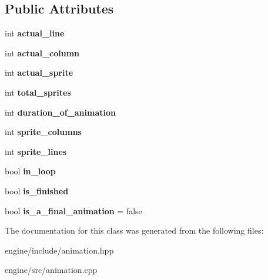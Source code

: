 \subsection*{Public Attributes}
\begin{DoxyCompactItemize}
\item 
int {\bfseries actual\+\_\+line}\hypertarget{classengine_1_1_animation_ac0d6da823ddcc6e359df78bd3a88dbfc}{}\label{classengine_1_1_animation_ac0d6da823ddcc6e359df78bd3a88dbfc}

\item 
int {\bfseries actual\+\_\+column}\hypertarget{classengine_1_1_animation_afe6d357389bc518781784af14d561445}{}\label{classengine_1_1_animation_afe6d357389bc518781784af14d561445}

\item 
int {\bfseries actual\+\_\+sprite}\hypertarget{classengine_1_1_animation_a85d2b1875a28c207776435d698cf1ac7}{}\label{classengine_1_1_animation_a85d2b1875a28c207776435d698cf1ac7}

\item 
int {\bfseries total\+\_\+sprites}\hypertarget{classengine_1_1_animation_a399696657e2466e4680f4b37ae2e6efd}{}\label{classengine_1_1_animation_a399696657e2466e4680f4b37ae2e6efd}

\item 
int {\bfseries duration\+\_\+of\+\_\+animation}\hypertarget{classengine_1_1_animation_a2e2decb12d84400df1bda29edd9c9633}{}\label{classengine_1_1_animation_a2e2decb12d84400df1bda29edd9c9633}

\item 
int {\bfseries sprite\+\_\+columns}\hypertarget{classengine_1_1_animation_a1d20c1eb0b8df2de59c5ccd0934025c7}{}\label{classengine_1_1_animation_a1d20c1eb0b8df2de59c5ccd0934025c7}

\item 
int {\bfseries sprite\+\_\+lines}\hypertarget{classengine_1_1_animation_a84a8973da1406fa64d936d8c8377fec3}{}\label{classengine_1_1_animation_a84a8973da1406fa64d936d8c8377fec3}

\item 
bool {\bfseries in\+\_\+loop}\hypertarget{classengine_1_1_animation_a16077db74242167b01a804227a93b6f9}{}\label{classengine_1_1_animation_a16077db74242167b01a804227a93b6f9}

\item 
bool {\bfseries is\+\_\+finished}\hypertarget{classengine_1_1_animation_a8a156351cd9b5f774f549dbc092ff1b1}{}\label{classengine_1_1_animation_a8a156351cd9b5f774f549dbc092ff1b1}

\item 
bool {\bfseries is\+\_\+a\+\_\+final\+\_\+animation} = false\hypertarget{classengine_1_1_animation_a3c4b59c6598adccf765a30185ead8190}{}\label{classengine_1_1_animation_a3c4b59c6598adccf765a30185ead8190}

\end{DoxyCompactItemize}


The documentation for this class was generated from the following files\+:\begin{DoxyCompactItemize}
\item 
engine/include/animation.\+hpp\item 
engine/src/animation.\+cpp\end{DoxyCompactItemize}
